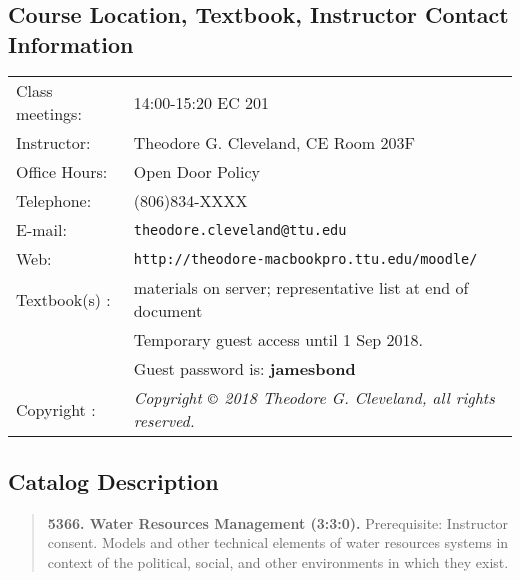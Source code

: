\documentclass[12pt]{article}
\begin{document}
\section*{ }
\subsection*{{Course Location, Textbook, Instructor Contact Information}}
\begin{tabular}{p{1.5in}p{5.0in}}
Class meetings:  &    14:00-15:20 EC 201 \\
Instructor: & Theodore G. Cleveland, CE Room 203F \\
Office Hours: & Open Door Policy \\
Telephone: & (806)834-XXXX \\
E-mail: & \texttt{theodore.cleveland@ttu.edu}\\
Web: & \texttt{http://theodore-macbookpro.ttu.edu/moodle/} \\
Textbook(s) : &  materials on server; representative list at end of document\\
~ & Temporary guest access until 1 Sep 2018.  \\
~ & Guest password is: \textbf{jamesbond} \\ 
Copyright : & \textsl{Copyright $\copyright$ 2018 Theodore G. Cleveland, all rights reserved.} \\
\end{tabular}
\subsection*{{Catalog Description}}
\begin{quote} \textbf{5366. Water Resources Management (3:3:0).}  Prerequisite: Instructor consent. Models and other technical elements of water resources systems in context of the political, social, and other environments in which they exist.
\end{quote}
\end{document}
